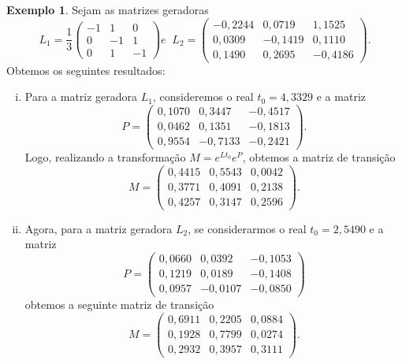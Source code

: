 \documentclass[twoside,openright,titlepage,numbers=noenddot,headinclude,  lineheaders footinclude=true,cleardoublepage=empty,
                                BCOR=5mm,paper=a4,fontsize=12pt ]{scrbook}
\theoremstyle{definition}
\newtheorem{exmp}{Exemplo}[section]
\begin{document}
\begin{exmp}
Sejam as matrizes geradoras
\[
L_1 = \frac{1}{3}
\begin{pmatrix}
-1 & 1 & 0\\
0 & -1 & 1\\
0 & 1 & -1
\end{pmatrix}
e \;\;
L_2 = 
\begin{pmatrix}
-0,2244& 0,0719& 1,1525\\
0,0309& -0,1419& 0,1110\\
0,1490& 0,2695& -0,4186
\end{pmatrix}
.
\]
Obtemos os seguintes resultados:
\begin{enumerate}[(i)]
\item Para a matriz geradora $L_1$, consideremos o real $t_0= 4,3329$ e a matriz
\[
P = 
\begin{pmatrix}
0,1070&  0,3447& -0,4517\\
0,0462&  0,1351& -0,1813\\
0,9554&  -0,7133& -0,2421
\end{pmatrix}
.
\]
Logo, realizando a transformação $M = e^{Lt_0} e^P$, obtemos a matriz de transição
\[
M = 
\begin{pmatrix}
0,4415&  0,5543& 0,0042\\
0,3771&  0,4091& 0,2138\\
0,4257&  0,3147& 0,2596
\end{pmatrix}
.
\]
\item Agora, para a matriz geradora $L_2$, se considerarmos o real $t_0= 2,5490$ e a matriz
\[
P = 
\begin{pmatrix}
0,0660& 0,0392& -0,1053\\
0,1219& 0,0189& -0,1408\\
0,0957& -0,0107& -0,0850
\end{pmatrix}
\]
obtemos a seguinte matriz de transição
\[
M = 
\begin{pmatrix}
0,6911 &0,2205 &0,0884\\
0,1928 &0,7799 &0,0274\\
0,2932 &0,3957 &0,3111

\end{pmatrix}
.
\]
\end{enumerate}
\end{exmp}
\end{document}

